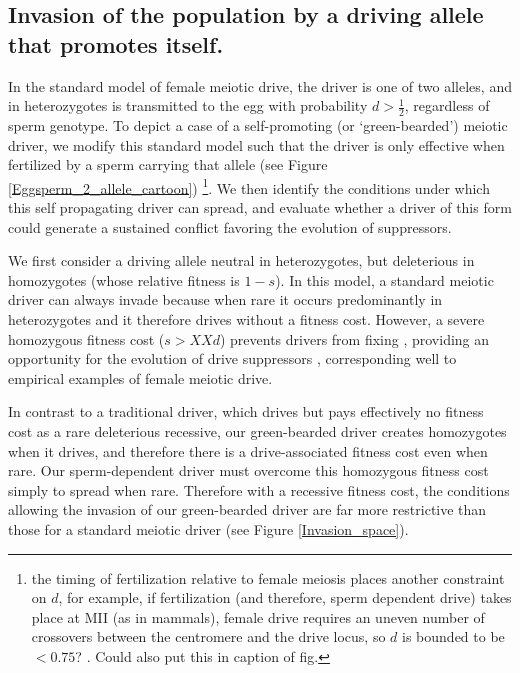 \documentclass[12pt,letterpaper]{article}
\begin{document}
\subsection*{ Invasion of the population by a driving allele that promotes
itself.}

In the standard model of female meiotic drive, the driver is one of two alleles, and in heterozygotes is transmitted to the egg with probability  $d > \frac{1}{2}$, regardless of sperm genotype. 
To depict a case of a self-promoting (or `green-bearded') meiotic
driver,  we modify this standard model such that the driver is only effective when fertilized by a sperm carrying that allele (see Figure
\ref{Eggsperm_2_allele_cartoon}) \footnote{the timing of fertilization relative to female meiosis places another constraint on $d$, for example, if fertilization (and therefore, sperm dependent drive) takes place at MII (as in mammals),
	female drive requires an uneven number of crossovers between the centromere and the drive locus, 
	so $d$ is bounded to be $<0.75$? \citep[see ][ for discussion]{Buckler1999}. Could also put this in
        caption of fig.}.
We then identify the conditions under which this self propagating driver can spread, and evaluate whether a driver of this form could generate a sustained conflict favoring the evolution of suppressors. 



We first consider a driving allele neutral in heterozygotes, 
	but deleterious in homozygotes (whose relative fitness is $1-s$).  
In this model, a standard meiotic driver can always invade because 
	when rare it occurs predominantly in heterozygotes and it therefore drives without a fitness cost. 
However, a severe homozygous fitness cost ($s>XXd$) prevents  
	drivers from fixing  \citep{Prout1973}, 
	providing an opportunity for the evolution of
	drive suppressors \citep{XX}, corresponding well to 
	empirical examples of female meiotic drive. 



In contrast to a traditional driver, which drives but pays effectively
no fitness cost as a rare deleterious recessive, 
	our green-bearded driver creates homozygotes
        when it drives, and therefore there is a drive-associated fitness cost even when rare. 
Our sperm-dependent driver must overcome this homozygous fitness cost simply to spread when rare.
Therefore with a recessive fitness cost,
	the conditions allowing the invasion of our green-bearded driver 
 	are far more restrictive than those for a standard meiotic driver (see Figure \ref{Invasion_space}).
\end{document}
